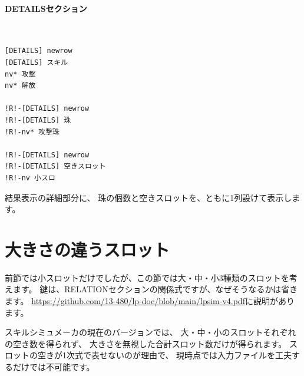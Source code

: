\documentclass[dvipdfmx]{jsarticle}
\begin{document}
\paragraph{DETAILSセクション}~\medskip
{\footnotesize\begin{mdframed}\begin{Verbatim}[commandchars=!<>]
[DETAILS] newrow
[DETAILS] スキル
nv* 攻撃
nv* 解放

!R!-[DETAILS] newrow
!R!-[DETAILS] 珠
!R!-nv* 攻撃珠

!R!-[DETAILS] newrow
!R!-[DETAILS] 空きスロット
!R!-nv 小スロ 
\end{Verbatim}
\end{mdframed}}
\medskip

結果表示の詳細部分に、
珠の個数と空きスロットを、ともに1列設けて表示します。

\begin{center}
\end{center}

\section{大きさの違うスロット} %
前節では小スロットだけでしたが、この節では大・中・小3種類のスロットを考えます。
鍵は、RELATIONセクションの関係式ですが、なぜそうなるかは省きます。
\url{https://github.com/13-480/lp-doc/blob/main/lpsim-v4.pdf}に説明があります。

スキルシミュメーカの現在のバージョンでは、
大・中・小のスロットそれぞれの空き数を得られず、
大きさを無視した合計スロット数だけが得られます。
スロットの空きが1次式で表せないのが理由で、
現時点では入力ファイルを工夫するだけでは不可能です。
\end{document}
